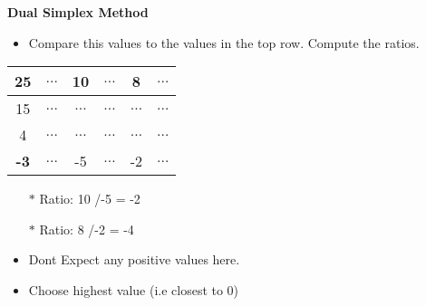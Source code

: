 \documentclass{beamer}
\begin{document}
\begin{frame}
\noindent \textbf{Dual Simplex Method}	\\
	\begin{itemize}
		\item Compare this values to the values in the top row. Compute the ratios. 
	\end{itemize}
	{
		\large
		\begin{center}
			\begin{tabular}{|c||c|c|c|c|c|}
				\hline 25 & $\ldots$ & 10 & $\ldots$ & 8 & $\ldots$ \\  \hline
				\hline 15 & $\ldots$ & $\ldots$ & $\ldots$ & $\ldots$ & $\ldots$ \\ 
				\hline 4 & $\ldots$ & $\ldots$ & $\ldots$ & $\ldots$ & $\ldots$ \\  
				\hline \textbf{-3} & $\ldots$ & -5 & $\ldots$ & -2 & $\ldots$ \\ 
				\hline 
			\end{tabular} 	
		\end{center}
	}
\begin{itemize}
	\item[$\ast$] Ratio: 10 /-5  = -2
	\item[$\ast$] Ratio: 8 /-2 = -4
\end{itemize}
\bigskip
\begin{itemize}
	\item Dont Expect any positive values here. 
	\item Choose highest value (i.e closest to 0)
\end{itemize}
\end{frame}
\end{document}
